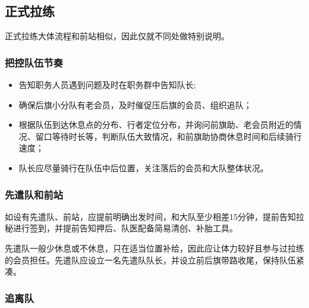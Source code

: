\documentclass[UTF8]{ctexart}
\begin{document}
\subsection{正式拉练}

正式拉练大体流程和前站相似，因此仅就不同处做特别说明。

\subsubsection{把控队伍节奏}

\begin{itemize}[nosep,left=2em]
    \item 告知职务人员遇到问题及时在职务群中告知队长;
    \item 确保后旗小分队有老会员，及时催促压后旗的会员、组织追队；
    \item 根据队伍到达休息点的分布、行者定位分布，并询问前旗助、老会员附近的情况、留口等待时长等，判断队伍大致情况，和前旗助协商休息时间和后续骑行速度；
    \item 队长应尽量骑行在队伍中后位置，关注落后的会员和大队整体状况。
\end{itemize}

\subsubsection{先遣队和前站}

如设有先遣队、前站，应提前明确出发时间，和大队至少相差15分钟，提前告知拉秘进行签到，并提前告知押后、队医配备简易清创、补胎工具。

先遣队一般少休息或不休息，只在适当位置补给，因此应让体力较好且参与过拉练的会员担任。先遣队应设立一名先遣队队长，并设立前后旗带路收尾，保持队伍紧凑。

\subsubsection{追离队}
\end{document}
